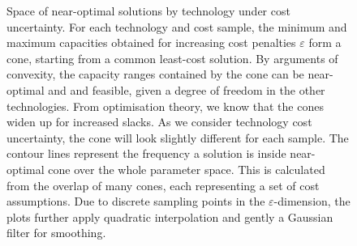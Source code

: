 \begin{figure}
    \vspace{-2cm}
    \noindent{}
    \noindent{}
    \noindent{}
    \caption{
    Space of near-optimal solutions by technology under cost uncertainty.
    For each technology and cost sample,
    the minimum and maximum capacities obtained for increasing cost penalties
    $\varepsilon$ form a cone, starting from a common least-cost solution. 
    By arguments of convexity, the capacity ranges contained by the cone can be near-optimal and and feasible, given a degree of freedom in the other technologies.
    From optimisation theory, we know that the cones widen up for increased slacks.
    As we consider technology cost uncertainty, the cone will look slightly different for each sample.
    The contour lines represent the frequency a solution is inside near-optimal cone over the whole parameter space.
    This is calculated from the overlap of many cones, each representing a set of cost assumptions.
    Due to discrete sampling points in the $\varepsilon$-dimension, the plots further apply quadratic interpolation and gently a Gaussian filter for smoothing.
    }
    \label{fig:fuzzycone}
\end{figure}

